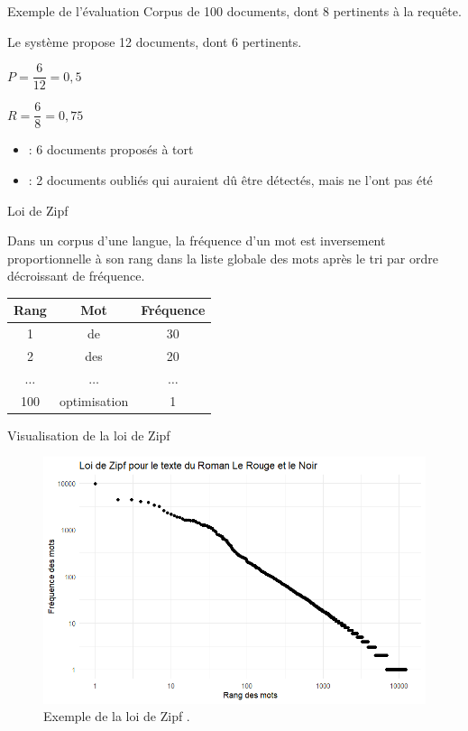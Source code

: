 \documentclass[xetex,xcolor={table,usenames,dvipsnames}]{beamer}
\newcommand{\bolder}[1]{{\color{purple}\bfseries#1}}
\begin{document}
\begin{frame}{Exemple de l'évaluation}
	Corpus de 100 documents, dont 8 pertinents à la requête.
	
	Le système propose 12 documents, dont 6 pertinents.
	
	$P = \dfrac{6}{12} = 0,5$
	
	$R = \dfrac{6}{8} = 0,75$
	
	\begin{itemize}
		\item \og{}\bolder{bruit}\fg{} : 6 documents proposés à tort
		\item \og{}\bolder{silence}\fg{} : 2 documents \og{}oubliés\fg{} qui auraient dû être détectés, mais ne l'ont pas été
	\end{itemize}
\end{frame}

\begin{frame}{Loi de Zipf}
		\begin{block}{\vspace{-6mm}}
		\justifying
	Dans un corpus d'une langue, la fréquence d'un mot est inversement proportionnelle à son rang dans la liste globale des mots après le tri par ordre décroissant de fréquence.
	\end{block}
	\begin{table}[h]
		\begin{tabular}{|c|c|c|}
			\hline
			\textbf{Rang} & \textbf{Mot} & Fréquence\\
						\hline
			1 & de & 30\\
						\hline
			2 & des & 20\\
						\hline
			$\dots$ &$\dots$ & $\dots$\\
						\hline
			100 & optimisation & 1\\
						\hline
		\end{tabular}
	\end{table}

\end{frame}
\begin{frame}{Visualisation de la loi de Zipf}
	\begin{figure}[h] %
		\centering
		\includegraphics[width=0.80\linewidth]{img/zipf.png}
		\caption{Exemple de la loi de Zipf \citep{rherrad}.}
		\label{fig:zipf}
	\end{figure}
\end{frame}
\end{document}
